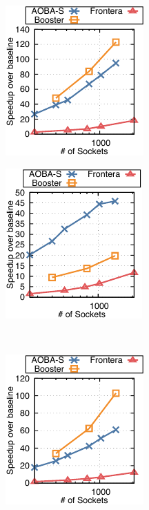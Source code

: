 ﻿\documentclass[submit,techrep,noauthor]{ipsj}
\begin{document}
\begin{figure}[tb]
  \centering
  \begin{minipage}[b]{0.46\hsize}
    \centering
    \includegraphics{figs/spechpc_lbm_l.pdf}
    \label{fig:lbm-l}
  \end{minipage}
  \begin{minipage}[b]{0.46\hsize}
    \centering
    \includegraphics{figs/spechpc_tealeaf_l.pdf}
    \label{fig:tealeaf-l}
  \end{minipage} \\
  \begin{minipage}[b]{0.46\hsize}
    \centering
    \includegraphics{figs/spechpc_clvleaf_l.pdf}
    \label{fig:clvleaf-l}
  \end{minipage}
  \begin{minipage}[b]{0.46\hsize}

\end{minipage}
\end{figure}
\end{document}
